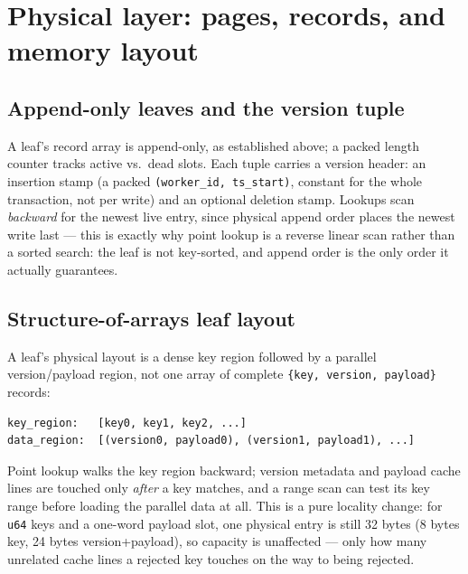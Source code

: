 \documentclass[11pt]{article}
\newcommand{\code}[1]{\texttt{#1}}
\begin{document}
\section{Physical layer: pages, records, and memory layout}
\label{sec:physical}

\subsection{Append-only leaves and the version tuple}

A leaf's record array is append-only, as established above; a packed length counter
tracks active vs.\ dead slots. Each tuple carries a version header: an insertion
stamp (a packed \code{(worker\_id, ts\_start)}, constant for the whole transaction,
not per write) and an optional deletion stamp. Lookups scan \emph{backward} for the
newest live entry, since physical append order places the newest write last ---
this is exactly why point lookup is a reverse linear scan rather than a sorted
search: the leaf is not key-sorted, and append order is the only order it actually
guarantees.

\subsection{Structure-of-arrays leaf layout}

A leaf's physical layout is a dense key region followed by a parallel
version/payload region, not one array of complete \code{\{key, version, payload\}}
records:

\begin{lstlisting}
key_region:   [key0, key1, key2, ...]
data_region:  [(version0, payload0), (version1, payload1), ...]
\end{lstlisting}

Point lookup walks the key region backward; version metadata and payload cache
lines are touched only \emph{after} a key matches, and a range scan can test its key
range before loading the parallel data at all. This is a pure locality change: for
\code{u64} keys and a one-word payload slot, one physical entry is still 32 bytes
(8 bytes key, 24 bytes version+payload), so capacity is unaffected --- only how many
unrelated cache lines a rejected key touches on the way to being rejected.
\end{document}
